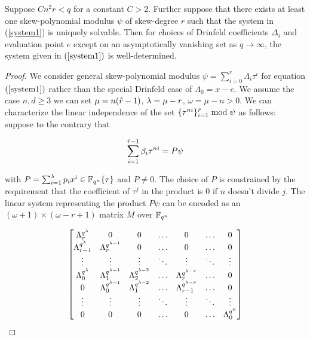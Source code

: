 
\begin{lemma}\label{detdeg}
Suppose $Cn^2r < q$ for a constant $C>2$. Further suppose that there exists at least one skew-polynomial modulus $\psi$ of skew-degree $r$ such that the system in (\ref{system1}) is uniquely solvable. Then for choices of Drinfeld coefficients $\Delta_i$ and evaluation point $e$ except on an asymptotically vanishing set as $q \to \infty$, the system given in $(\ref{system1})$ is well-determined.
\end{lemma}

\begin{proof}
We consider general skew-polynomial modulus $\psi = \sum_{i=0}^{r} \Lambda_i \tau^i$ for equation $(\ref{system1})$ rather than the special Drinfeld case of $\Lambda_0 = x - e$. We assume the case $n,d \geq 3$ we can set $\mu = n(\hat{r} - 1)$, $\lambda = \mu - r$, $\omega = \mu - n > 0$. We can characterize the linear independence of the set $\{\tau^{ni} \}_{i =1}^{\hat{r}} \bmod \psi$ as follows: suppose to the contrary that

\begin{equation}\label{mult}
    \sum_{i=1}^{\hat{r} - 1} \beta_i \tau^{ni} = P \psi
\end{equation}

with $P = \sum_{i= 1}^{\lambda} p_ix^i \in \mathbb{F}_{q^n}\{\tau \}$ and $P \neq 0 $. The choice of $P$ is constrained by the requirement that the coefficient of $\tau^{j}$ in the product is 0 if $n$ doesn't divide $j$. The linear system representing the product $P\psi$ can be encoded as an $ (\omega + 1) \times (\omega - r + 1)$ matrix $M$ over $\mathbb{F}_{q^n}$

\begin{equation}
    \label{productsystem}
    \begin{bmatrix}
    \Lambda_{r}^{q^{\lambda}} & 0 & 0 & \ldots & 0 & \ldots & 0 \\
    \Lambda_{r - 1}^{q^{\lambda}} & \Lambda_{r}^{q^{\lambda - 1}} & 0 & \ldots & 0 & \ldots & 0 \\
    \vdots & \vdots & \vdots & \ddots & \vdots & \ddots & \vdots \\
    \Lambda_{0}^{q^{\lambda}} & \Lambda_{1}^{q^{\lambda - 1}} & \Lambda_{2}^{q^{\lambda - 2}} & \ldots & \Lambda_{r}^{q^{\lambda - r}} & \ldots & 0 \\
    0 & \Lambda_{0}^{q^{\lambda - 1}} & \Lambda_{1}^{q^{\lambda - 2}} & \ldots & \Lambda_{r-1}^{q^{\lambda - r}} & \ldots & 0 \\
    \vdots & \vdots & \vdots & \ddots & \vdots & \ddots & \vdots \\
    0 & 0 & 0 & \ldots & 0 & \ldots & \Lambda_0^{q^{n}}
    

\end{bmatrix}
\end{equation}
\end{proof}
